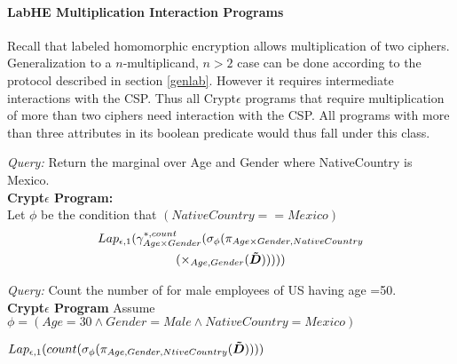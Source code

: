 \paragraph{\textbf{LabHE Multiplication Interaction Programs}}
Recall that labeled homomorphic encryption allows multiplication of two ciphers. Generalization to a $n$-multiplicand, $n > 2$ case can be done according to the protocol described in section \ref{genlab}. However it requires intermediate interactions with the \textsf{CSP}. Thus all Crypt$\epsilon$ programs that require multiplication of more than two ciphers need interaction with the \textsf{CSP}. 
All programs with more than three attributes in its boolean predicate would thus fall under this class.
\begin{exmp}\textit{Query:} Return the marginal over Age and Gender where NativeCountry is Mexico. \\\textbf{Crypt$\epsilon$ Program:}\\ Let $\phi$ be the condition that $(NativeCountry==Mexico) $ \begin{multline*}Lap_{\epsilon,1}(\gamma^{*,count}_{Age\times Gender}(\sigma_{\phi}(\pi_{Age\times Gender, NativeCountry}\\(\times_{Age,Gender}(\boldsymbol{\tilde{D}})))))\end{multline*}\end{exmp}%
\begin{exmp} \textit{Query:} Count the number of for male employees of US having age =50. \\\textbf{Crypt$\epsilon$ Program} Assume $\phi=(Age=30 \wedge Gender=Male \wedge NativeCountry=Mexico)$ \end{exmp} $Lap_{\epsilon,1}(count(\sigma_{\phi}(\pi_{Age,Gender,NtiveCountry}(\boldsymbol{\tilde{D}}))))$
